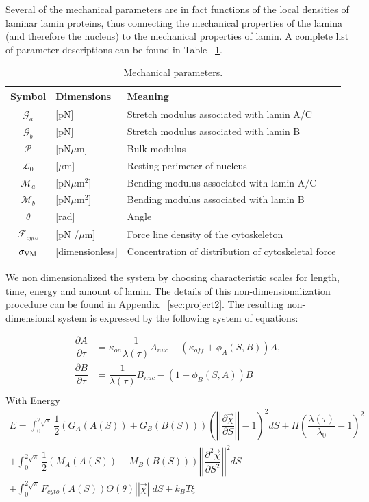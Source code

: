 Several of the mechanical parameters are in fact functions of the local densities of laminar lamin proteins, thus connecting the mechanical properties of the lamina (and therefore the nucleus) to the mechanical properties of lamin. A complete list of parameter descriptions can be found in Table ~\ref{tab:nucmodelparameters}.

\begin{table}[t!]
\caption{Mechanical parameters.}\centering \label{tab:nucmodelparameters} 
\begin{tabular}{ c  l  l}
\hline
Symbol & Dimensions & Meaning \\
\hline
$\mathcal{G}_a $ & [pN]  & Stretch modulus associated with lamin A/C \\
$\mathcal{G}_b$& [pN] & Stretch modulus associated with lamin B\\
$\mathcal{P}$ & [pN$\mu$m] & Bulk modulus \\
$\mathcal{L}_0$  & [$\mu$m] & Resting perimeter of nucleus\\
$\mathcal{M}_a$ & [pN$\mu$m$^2$] &  Bending modulus associated with lamin A/C\\
$\mathcal{M}_b $ & [pN$\mu$m$^2$] &  Bending modulus associated with lamin B\\
$\theta$ &  [rad] & Angle \\
$\mathcal{F}_{cyto}$ & [pN /$\mu$m] & Force line density of the cytoskeleton\\
$\sigma_{\rm VM}$ & [dimensionless] & Concentration of distribution of cytoskeletal force\\
\hline
\end{tabular}
\end{table}


We non dimensionalized the system by choosing characteristic scales for length, time, energy and amount of lamin. The details of this non-dimensionalization procedure can be found in Appendix ~\ref{sec:project2}. The resulting non-dimensional system is expressed by the following system of equations:

\begin{align}
\dfrac{\partial A}{\partial \tau} &= \kappa_{on}\dfrac{1}{\lambda (\tau)} A_{nuc}  - (\kappa_{off}+ \phi_A (S,B)) A,  \\[10pt]
\dfrac{\partial B}{\partial \tau} &= \dfrac{1}{\lambda (\tau)} B_{nuc}  - (1+ \phi_B (S,A)) B  \\[10pt]
\end{align}
With Energy 
\begin{align}
 E = \displaystyle \int_0^{2 \sqrt{\pi}} \dfrac{1}{2} (G_A(A(S))+ G_B(B(S)))\left( \left |\left|  \dfrac{\partial \vec{\chi} }{\partial S} \right|\right| - 1\right)^2  dS + \Pi \left(\dfrac{\lambda(\tau)}{\lambda_0} -1\right)^2\\[10pt]
 +\displaystyle\int_0^{2\sqrt{\pi}} \dfrac{1}{2 } (M_A(A(S))+ M_B(B(S)))\left|\left| \dfrac{\partial^2 \vec{\chi}}{\partial S^2} \right|\right|^2 dS\\[10pt]
+ \displaystyle\int_0^{2\sqrt{\pi}} F_{cyto}(A(S))\Theta (\theta) \left|\left| \vec{\chi} \right|\right| dS +k_BT \xi
\end{align}

